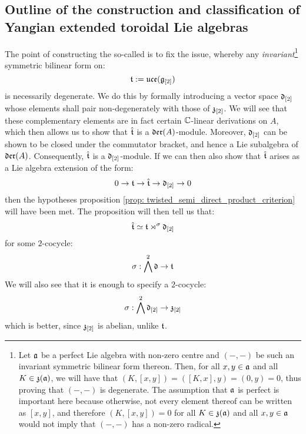     \subsection{Outline of the construction and classification of Yangian extended toroidal Lie algebras}
        The point of constructing the so-called  is to fix the issue, whereby any \textit{invariant}\footnote{Let $\mathfrak{a}$ be a perfect Lie algebra with non-zero centre and $(-, -)$ be such an invariant symmetric bilinear form thereon. Then, for all $x, y \in \mathfrak{a}$ and all $K \in \mathfrak{z}(\mathfrak{a})$, we will have that $(K, [x, y]) = ([K, x], y) = (0, y) = 0$, thus proving that $(-, -)$ is degenerate. The assumption that $\mathfrak{a}$ is perfect is important here because otherwise, not every element thereof can be written as $[x, y]$, and therefore $(K, [x, y]) = 0$ for all $K \in \mathfrak{z}(\mathfrak{a})$ and all $x, y \in \mathfrak{a}$ would not imply that $(-, -)$ has a non-zero radical.} symmetric bilinear form on:
            $$\mathfrak{t}:= \mathfrak{uce}(\mathfrak{g}_{[2]})$$
        is necessarily degenerate. We do this by formally introducing a  vector space $\mathfrak{d}_{[2]}$ whose elements shall pair non-degenerately with those of $\mathfrak{z}_{[2]}$. We will see that these complementary elements are in fact certain $\mathbb{C}$-linear derivations on $A$, which then allows us to show that $\hat{\mathfrak{t}}$ is a $\mathfrak{der}(A)$-module. Moreover, $\mathfrak{d}_{[2]}$ can be shown to be closed under the commutator bracket, and hence a Lie subalgebra of $\mathfrak{der}(A)$. Consequently, $\hat{\mathfrak{t}}$ is a $\mathfrak{d}_{[2]}$-module. If we can then also show that $\hat{\mathfrak{t}}$ arises as a Lie algebra extension of the form:
            $$0 \to \mathfrak{t} \to \hat{\mathfrak{t}} \to \mathfrak{d}_{[2]} \to 0$$
        then the hypotheses proposition \ref{prop: twisted_semi_direct_product_criterion} will have been met. The proposition will then tell us that:
            $$\hat{\mathfrak{t}} \simeq \mathfrak{t} \rtimes^{\sigma} \mathfrak{d}_{[2]}$$
        for some $2$-cocycle:
            $$\sigma: \bigwedge^2 \mathfrak{d} \to \mathfrak{t}$$
        We will also see that it is enough to specify a $2$-cocycle:
            $$\sigma: \bigwedge^2 \mathfrak{d}_{[2]} \to \mathfrak{z}_{[2]}$$
        which is better, since $\mathfrak{z}_{[2]}$ is abelian, unlike $\mathfrak{t}$.
        
